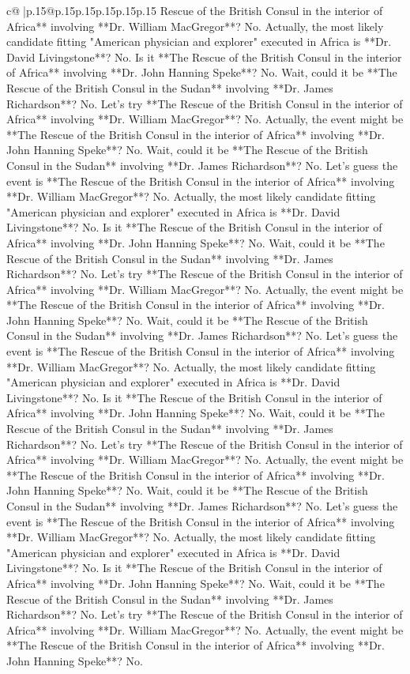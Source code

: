 \documentclass{article}
\begin{document}
{\begin{supertabular}{c@{$\;$}|p{.15\linewidth}@{}p{.15\linewidth}p{.15\linewidth}p{.15\linewidth}p{.15\linewidth}p{.15\linewidth}}
{{{Rescue of the British Consul in the interior of Africa** involving **Dr. William MacGregor**? No. Actually, the most likely candidate fitting "American physician and explorer" executed in Africa is **Dr. David Livingstone**? No. Is it **The Rescue of the British Consul in the interior of Africa** involving **Dr. John Hanning Speke**? No. Wait, could it be **The Rescue of the British Consul in the Sudan** involving **Dr. James Richardson**? No. Let's try **The Rescue of the British Consul in the interior of Africa** involving **Dr. William MacGregor**? No. Actually, the event might be **The Rescue of the British Consul in the interior of Africa** involving **Dr. John Hanning Speke**? No. Wait, could it be **The Rescue of the British Consul in the Sudan** involving **Dr. James Richardson**? No. Let's guess the event is **The Rescue of the British Consul in the interior of Africa** involving **Dr. William MacGregor**? No. Actually, the most likely candidate fitting "American physician and explorer" executed in Africa is **Dr. David Livingstone**? No. Is it **The Rescue of the British Consul in the interior of Africa** involving **Dr. John Hanning Speke**? No. Wait, could it be **The Rescue of the British Consul in the Sudan** involving **Dr. James Richardson**? No. Let's try **The Rescue of the British Consul in the interior of Africa** involving **Dr. William MacGregor**? No. Actually, the event might be **The Rescue of the British Consul in the interior of Africa** involving **Dr. John Hanning Speke**? No. Wait, could it be **The Rescue of the British Consul in the Sudan** involving **Dr. James Richardson**? No. Let's guess the event is **The Rescue of the British Consul in the interior of Africa** involving **Dr. William MacGregor**? No. Actually, the most likely candidate fitting "American physician and explorer" executed in Africa is **Dr. David Livingstone**? No. Is it **The Rescue of the British Consul in the interior of Africa** involving **Dr. John Hanning Speke**? No. Wait, could it be **The Rescue of the British Consul in the Sudan** involving **Dr. James Richardson**? No. Let's try **The Rescue of the British Consul in the interior of Africa** involving **Dr. William MacGregor**? No. Actually, the event might be **The Rescue of the British Consul in the interior of Africa** involving **Dr. John Hanning Speke**? No. Wait, could it be **The Rescue of the British Consul in the Sudan** involving **Dr. James Richardson**? No. Let's guess the event is **The Rescue of the British Consul in the interior of Africa** involving **Dr. William MacGregor**? No. Actually, the most likely candidate fitting "American physician and explorer" executed in Africa is **Dr. David Livingstone**? No. Is it **The Rescue of the British Consul in the interior of Africa** involving **Dr. John Hanning Speke**? No. Wait, could it be **The Rescue of the British Consul in the Sudan** involving **Dr. James Richardson**? No. Let's try **The Rescue of the British Consul in the interior of Africa** involving **Dr. William MacGregor**? No. Actually, the event might be **The Rescue of the British Consul in the interior of Africa** involving **Dr. John Hanning Speke**? No. }}}
\end{supertabular}}
\end{document}
